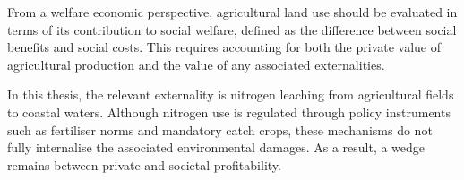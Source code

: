 \documentclass[12pt]{article}
\begin{document}
From a welfare economic perspective, agricultural land use should be evaluated in terms of its contribution to social welfare, defined as the difference between social benefits and social costs. This requires accounting for both the private value of agricultural production and the value of any associated externalities.

In this thesis, the relevant externality is nitrogen leaching from agricultural fields to coastal waters. Although nitrogen use is regulated through policy instruments such as fertiliser norms and mandatory catch crops, these mechanisms do not fully internalise the associated environmental damages. As a result, a wedge remains between private and societal profitability.






\end{document}
